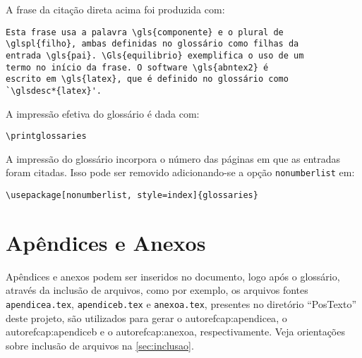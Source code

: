 A frase da citação direta acima foi produzida com:

\begin{SingleSpacing}%
\begin{verbatim}
Esta frase usa a palavra \gls{componente} e o plural de
\glspl{filho}, ambas definidas no glossário como filhas da
entrada \gls{pai}. \Gls{equilibrio} exemplifica o uso de um
termo no início da frase. O software \gls{abntex2} é
escrito em \gls{latex}, que é definido no glossário como
`\glsdesc*{latex}'.
\end{verbatim}
\end{SingleSpacing}

A impressão efetiva do glossário é dada com:

\begin{SingleSpacing}%
\begin{verbatim}
\printglossaries
\end{verbatim}
\end{SingleSpacing}

A impressão do glossário incorpora o número das páginas em que as entradas foram citadas. Isso pode ser removido adicionando-se a opção \texttt{nonumberlist} em:

\begin{SingleSpacing}%
\begin{verbatim}
\usepackage[nonumberlist, style=index]{glossaries}
\end{verbatim}
\end{SingleSpacing}

\section{Apêndices e Anexos}\label{sec:apendiceseanexos}

Apêndices e anexos podem ser inseridos no documento, logo após o glossário, através da inclusão de arquivos, como por exemplo, os arquivos fontes \texttt{apendicea.tex}, \texttt{apendiceb.tex} e  \texttt{anexoa.tex}, presentes no diretório ``PosTexto'' deste projeto, são utilizados para gerar o autoref{cap:apendicea}, o autoref{cap:apendiceb} e o autoref{cap:anexoa}, respectivamente. Veja orientações sobre inclusão de arquivos na \autoref{sec:inclusao}.

